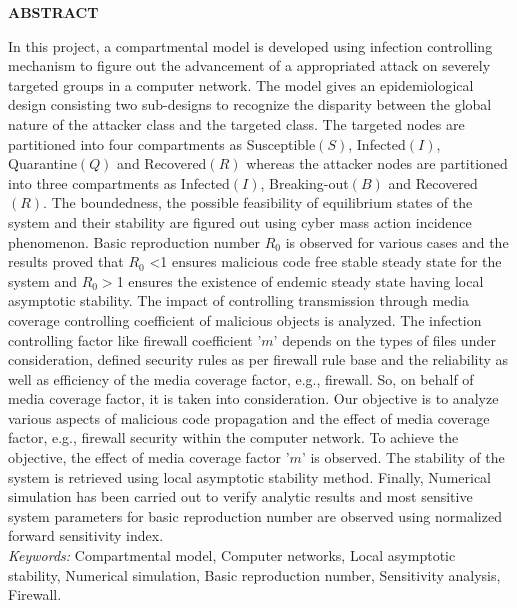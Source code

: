 \newpage
\newpage
{}
\begin{center}
{\large \bf ABSTRACT}
\end{center}
In this project, a compartmental model is developed using infection controlling mechanism
to figure out the advancement of a appropriated attack on severely targeted groups in a computer
network. The model gives an epidemiological design consisting two sub-designs to recognize the
disparity between the global nature of the attacker class and the targeted class. The
targeted nodes are partitioned into four compartments as Susceptible$(S)$, Infected$(I)$, Quarantine$(Q)$ and Recovered$(R)$
whereas the attacker nodes are partitioned into three compartments as Infected$(I)$, Breaking-out$(B)$ and Recovered$(R)$.
The boundedness, the possible feasibility of equilibrium states of the system and their stability are
figured out using cyber mass action incidence phenomenon. Basic reproduction number $R_0$ is
observed for various cases and the results proved that $R_0$ \textless 1 ensures malicious code free stable steady state for the system
and $R_0$$>$1 ensures the existence of endemic
steady state having local asymptotic stability. The impact of controlling
transmission through media coverage controlling coefficient of malicious objects is
analyzed. The infection controlling factor like firewall coefficient '$m$' depends
on the types of files under consideration, defined security rules as per
firewall rule base and the reliability as well as efficiency of the media coverage factor, e.g., firewall. So, on behalf of media coverage factor, it is taken into consideration.
Our objective is to analyze various aspects of malicious code propagation and the effect
of media coverage factor, e.g., firewall security within the computer network.
To achieve the objective, the effect of media coverage factor '$m$' is observed.
The stability of the system is retrieved using local asymptotic stability method.
Finally, Numerical simulation has
been carried out to verify analytic results and most sensitive system parameters for basic reproduction number are
observed using normalized forward sensitivity index. \\

{\it Keywords:} Compartmental model, Computer networks, Local asymptotic stability, Numerical simulation, Basic reproduction number,
Sensitivity analysis, Firewall.
